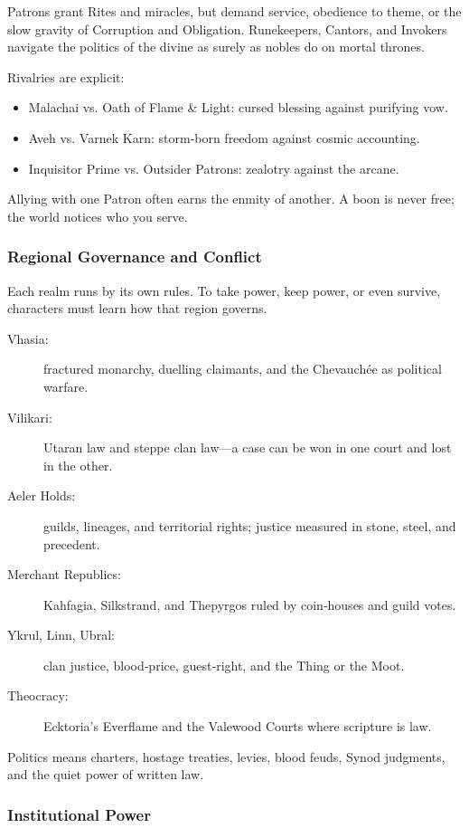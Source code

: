 Patrons grant Rites and miracles, but demand service, obedience to theme, or the slow gravity of Corruption and Obligation. Runekeepers, Cantors, and Invokers navigate the politics of the divine as surely as nobles do on mortal thrones.

Rivalries are explicit:
\begin{itemize}
    \item Malachai vs. Oath of Flame \& Light: cursed blessing against purifying vow.
    \item Aveh vs. Varnek Karn: storm‑born freedom against cosmic accounting.
    \item Inquisitor Prime vs. Outsider Patrons: zealotry against the arcane.
\end{itemize}
Allying with one Patron often earns the enmity of another. A boon is never free; the world notices who you serve.

\subsubsection{Regional Governance and Conflict}

Each realm runs by its own rules. To take power, keep power, or even survive, characters must learn how that region governs.

\begin{description}
    \item[Vhasia:] fractured monarchy, duelling claimants, and the Chevauchée as political warfare.
    \item[Vilikari:] Utaran law and steppe clan law---a case can be won in one court and lost in the other.
    \item[Aeler Holds:] guilds, lineages, and territorial rights; justice measured in stone, steel, and precedent.
    \item[Merchant Republics:] Kahfagia, Silkstrand, and Thepyrgos ruled by coin‑houses and guild votes.
    \item[Ykrul, Linn, Ubral:] clan justice, blood‑price, guest‑right, and the Thing or the Moot.
    \item[Theocracy:] Ecktoria's Everflame and the Valewood Courts where scripture is law.
\end{description}
Politics means charters, hostage treaties, levies, blood feuds, Synod judgments, and the quiet power of written law.

\subsubsection{Institutional Power}

